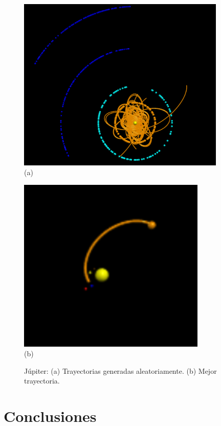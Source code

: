 \documentclass[12pt,letterpaper]{article}
\begin{document}
\begin{figure}
\centering
  \begin{minipage}{0.3\textwidth}
    \centering
    \includegraphics[width=0.885\textwidth]{Jupiter}\\
    {\small (a)} 
  \end{minipage}%
  \hspace{1mm}
  \begin{minipage}{0.3\textwidth}
    \centering
    \includegraphics[width=0.8\textwidth]{JupiterFinal}\\
    {\small (b)} 
  \end{minipage}
  \caption{Júpiter: (a) Trayectorias generadas aleatoriamente. (b) Mejor trayectoria.}
  \label{fig:jupiter}
\end{figure}

\section*{Conclusiones}
\end{document}
